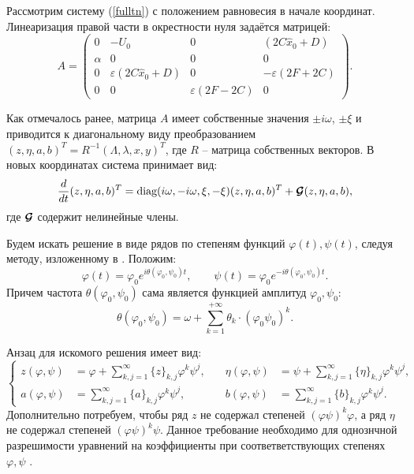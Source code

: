 Рассмотрим систему (\ref{fulltn}) с положением равновесия в начале координат. Линеаризация правой части в окрестности нуля задаётся матрицей:
\[
A = 
\begin{pmatrix}
0 & -U_0 & 0 & (2C \hat x_0 +  D) \\
\alpha & 0 & 0 & 0 \\
0 & \varepsilon (2C \hat x_0 +  D) & 0 & -\varepsilon (2F+2C) \\
0 & 0 & \varepsilon (2F-2C) & 0 
\end{pmatrix}.
\]

Как отмечалось ранее, матрица $A$ имеет собственные значения $\pm i\omega$, $\pm\xi$ и приводится к диагональному виду преобразованием $(z,\eta,a,b)^T = R^{-1}(\Lambda,\lambda,x,y)^T$, где $R$ -- матрица собственных векторов. В новых координатах система принимает вид:
\begin{align}
\frac{d}{dt}(z,\eta,a,b)^T = \text{diag}(i\omega, -i\omega, \xi, -\xi)(z,\eta,a,b)^T + \boldsymbol{\mathcal{G}}(z,\eta,a,b),
\label{new_eq}
\end{align}
где $\boldsymbol{\mathcal{G}}$ содержит нелинейные члены.

Будем искать решение в виде рядов по степеням функций $\varphi(t), \psi(t)$, следуя методу,
изложенному в \cite{siegel}. Положим:
$$\varphi(t) = \varphi_0 e^{i \theta (\varphi_0, \psi_0) t}, \qquad \psi(t) = \varphi_0 e^{-i \theta (\varphi_0, \psi_0) t}.$$
Причем частота $\theta (\varphi_0, \psi_0)$ сама является функцией амплитуд $\varphi_0, \psi_0$:
$$\theta(\varphi_0, \psi_0) = \omega + \sum_{k=1}^{+\infty}{\theta_k \cdot (\varphi_0 \psi_0)^k}.$$

Анзац для искомого решения имеет вид:
\begin{equation}
\left\{
    \begin{aligned}
        z(\varphi,\psi) &= \varphi + \textstyle\sum_{k,j=1}^{\infty} \{z\}_{k,j} \varphi^k \psi^j,
        &\quad
        \eta(\varphi,\psi) &= \psi + \textstyle\sum_{k,j=1}^{\infty} \{\eta\}_{k,j} \varphi^k \psi^j, \\[0.5ex]
        a(\varphi,\psi) &= \textstyle\sum_{k,j=1}^{\infty} \{a\}_{k,j} \varphi^k \psi^j,
        &\quad
        b(\varphi,\psi) &= \textstyle\sum_{k,j=1}^{\infty} \{b\}_{k,j} \varphi^k \psi^j.
    \end{aligned}
\right.
\label{predst3}
\end{equation}
Дополнительно потребуем, чтобы ряд $z$ не содержал степеней $(\varphi \psi)^k \varphi$, а ряд $\eta$ не содержал степеней $(\varphi \psi)^k \psi$. Данное требование необходимо для однознчной разрешимости уравнений на коэффициенты при соответветствующих степенях $\varphi,\psi$ \cite{siegel}. 

